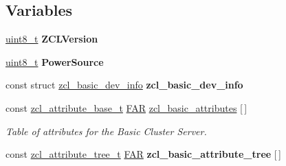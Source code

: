\subsection*{Variables}
\begin{DoxyCompactItemize}
\item 
\mbox{\label{group__zcl__basic_ga192f747f17a619e344287c3e7f8a0dca}} 
\hyperlink{group__hal__dos_gae1affc9ca37cfb624959c866a73f83c2}{uint8\+\_\+t} {\bfseries Z\+C\+L\+Version}
\item 
\mbox{\label{group__zcl__basic_ga339efb8b2f6c1ed9a5269621bc7adfbb}} 
\hyperlink{group__hal__dos_gae1affc9ca37cfb624959c866a73f83c2}{uint8\+\_\+t} {\bfseries Power\+Source}
\item 
const struct \hyperlink{structzcl__basic__dev__info}{zcl\+\_\+basic\+\_\+dev\+\_\+info} {\bfseries zcl\+\_\+basic\+\_\+dev\+\_\+info}
\item 
\mbox{\label{group__zcl__basic_ga721ebe2f6ae346632475cf178671d150}} 
const \hyperlink{structzcl__attribute__base__t}{zcl\+\_\+attribute\+\_\+base\+\_\+t} \hyperlink{group__hal_gaef060b3456fdcc093a7210a762d5f2ed}{F\+AR} \hyperlink{group__zcl__basic_ga721ebe2f6ae346632475cf178671d150}{zcl\+\_\+basic\+\_\+attributes} \mbox{[}$\,$\mbox{]}
\begin{DoxyCompactList}\small\item\em Table of attributes for the Basic Cluster Server. \end{DoxyCompactList}\item 
const \hyperlink{structzcl__attribute__tree__t}{zcl\+\_\+attribute\+\_\+tree\+\_\+t} \hyperlink{group__hal_gaef060b3456fdcc093a7210a762d5f2ed}{F\+AR} {\bfseries zcl\+\_\+basic\+\_\+attribute\+\_\+tree} \mbox{[}$\,$\mbox{]}
\end{DoxyCompactItemize}
